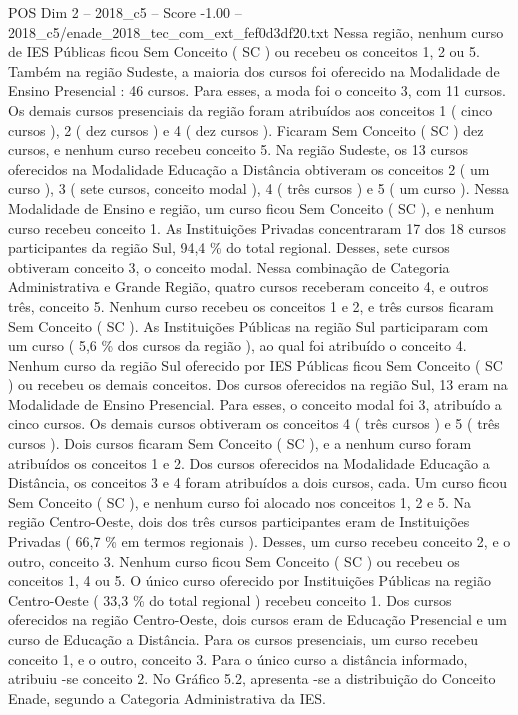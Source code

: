 \begin{textsample}{POS Dim 2 – 2018\_c5 – Score -1.00 – 2018\_c5/enade\_2018\_tec\_com\_ext\_fef0d3df20.txt}
Nessa região, nenhum curso de IES Públicas ficou Sem Conceito ( SC ) ou recebeu os conceitos 1, 2 ou 5.
Também na região Sudeste, a maioria dos cursos foi oferecido na Modalidade de Ensino Presencial : 46 cursos.
Para esses, a moda foi o conceito 3, com 11 cursos.
Os demais cursos presenciais da região foram atribuídos aos conceitos 1 ( cinco cursos ), 2 ( dez cursos ) e 4 ( dez cursos ).
Ficaram Sem Conceito ( SC ) dez cursos, e nenhum curso recebeu conceito 5.
Na região Sudeste, os 13 cursos oferecidos na Modalidade Educação a Distância obtiveram os conceitos 2 ( um curso ), 3 ( sete cursos, conceito modal ), 4 ( três cursos ) e 5 ( um curso ).
Nessa Modalidade de Ensino e região, um curso ficou Sem Conceito ( SC ), e nenhum curso recebeu conceito 1.
As Instituições Privadas concentraram 17 dos 18 cursos participantes da região Sul, 94,4 \% do total regional.
Desses, sete cursos obtiveram conceito 3, o conceito modal.
Nessa combinação de Categoria Administrativa e Grande Região, quatro cursos receberam conceito 4, e outros três, conceito 5.
Nenhum curso recebeu os conceitos 1 e 2, e três cursos ficaram Sem Conceito ( SC ).
As Instituições Públicas na região Sul participaram com um curso ( 5,6 \% dos cursos da região ), ao qual foi atribuído o conceito 4.
Nenhum curso da região Sul oferecido por IES Públicas ficou Sem Conceito ( SC ) ou recebeu os demais conceitos.
Dos cursos oferecidos na região Sul, 13 eram na Modalidade de Ensino Presencial.
Para esses, o conceito modal foi 3, atribuído a cinco cursos.
Os demais cursos obtiveram os conceitos 4 ( três cursos ) e 5 ( três cursos ).
Dois cursos ficaram Sem Conceito ( SC ), e a nenhum curso foram atribuídos os conceitos 1 e 2.
Dos cursos oferecidos na Modalidade Educação a Distância, os conceitos 3 e 4 foram atribuídos a dois cursos, cada.
Um curso ficou Sem Conceito ( SC ), e nenhum curso foi alocado nos conceitos 1, 2 e 5.
Na região Centro-Oeste, dois dos três cursos participantes eram de Instituições Privadas ( 66,7 \% em termos regionais ).
Desses, um curso recebeu conceito 2, e o outro, conceito 3.
Nenhum curso ficou Sem Conceito ( SC ) ou recebeu os conceitos 1, 4 ou 5.
O único curso oferecido por Instituições Públicas na região Centro-Oeste ( 33,3 \% do total regional ) recebeu conceito 1.
Dos cursos oferecidos na região Centro-Oeste, dois cursos eram de Educação Presencial e um curso de Educação a Distância.
Para os cursos presenciais, um curso recebeu conceito 1, e o outro, conceito 3.
Para o único curso a distância informado, atribuiu -se conceito 2.
No Gráfico 5.2, apresenta -se a distribuição do Conceito Enade, segundo a Categoria Administrativa da IES.

\end{textsample}

